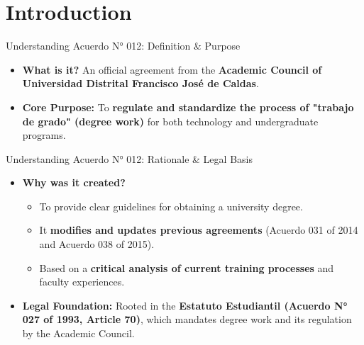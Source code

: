 \section{Introduction}


\begin{frame}{Understanding Acuerdo N° 012: Definition \& Purpose}
  \begin{itemize}
    \item<1-> \textbf{What is it?} An official agreement from the \textbf{Academic Council of Universidad Distrital Francisco José de Caldas}.
      \pause %
    \item<2-> \textbf{Core Purpose:} To \textbf{regulate and standardize the process of "trabajo de grado" (degree work)} for both technology and undergraduate programs.
  \end{itemize}
\end{frame}

  \begin{frame}{Understanding Acuerdo N° 012: Rationale \& Legal Basis}
    \begin{itemize}
      \item<1-> \textbf{Why was it created?}
        \begin{itemize}
          \item<2-> To provide clear guidelines for obtaining a university degree.
          \item<3-> It \textbf{modifies and updates previous agreements} (Acuerdo 031 of 2014 and Acuerdo 038 of 2015).
          \item<4-> Based on a \textbf{critical analysis of current training processes} and faculty experiences.
        \end{itemize}
        \pause
      \item<5-> \textbf{Legal Foundation:} Rooted in the \textbf{Estatuto Estudiantil (Acuerdo N° 027 of 1993, Article 70)}, which mandates degree work and its regulation by the Academic Council.
    \end{itemize}
  \end{frame}



